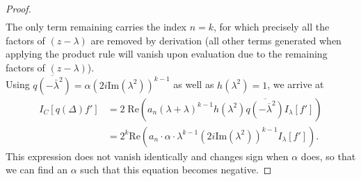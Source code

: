 \documentclass[10pt,a4paper,oneside,reqno]{amsart}
\begin{document}
\begin{proof}
\begin{align*}
\end{align*}The only term remaining carries the index $n=k$, for which precisely all the factors of $(z-\lambda)$ are removed by derivation (all other terms generated when applying the product rule will vanish upon evaluation due to the remaining factors of $(z-\lambda)$).\\Using $\overline{q(-\bar{\lambda}^2)}= \alpha(2 i \mathrm{Im}(\lambda^2))^{k-1}$ as well as $h(\lambda^2)= 1$, we arrive at
\begin{align*}
I_C[q(\Delta)f'] &= 2\;\mathrm{Re} \left(a_n (\lambda+\lambda)^{k-1} h(\lambda^2)\overline{q(-\overline{\lambda}^2)}I_\lambda[f'] \right)\\
&= 2^{k}\mathrm{Re} \left(a_n \cdot\alpha \cdot\lambda^{k-1}(2i\mathrm{Im}(\lambda^2))^{k-1}I_\lambda[f'] \right).
\end{align*}
This expression does not vanish identically and changes sign when $\alpha$ does, so that we can find an $\alpha$ such that this equation becomes negative.
\end{proof}
\end{document}
